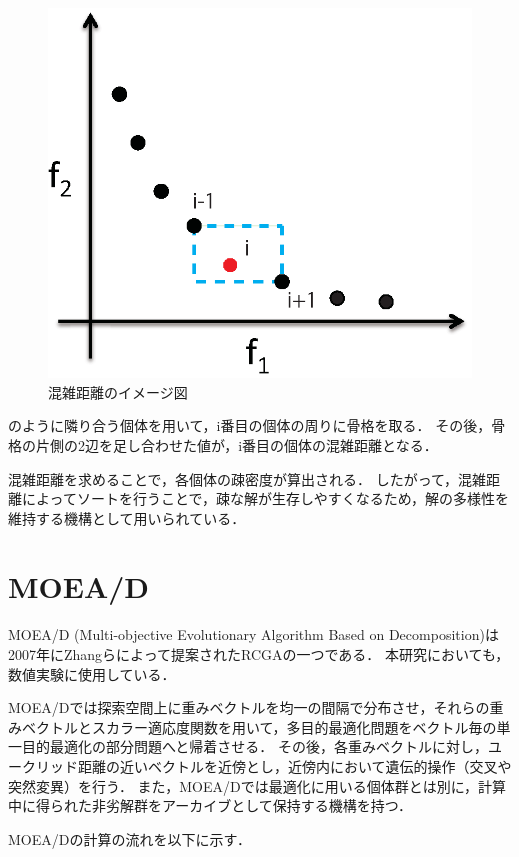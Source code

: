 \documentclass[../main/main]{subfiles}
\begin{document}
\begin{description}
\begin{figure}[htbp]
\begin{center}
\includegraphics[width=0.3\linewidth]{../figures/crowding.eps}
\end{center}
\setlength{\abovecaptionskip}{-5mm}
\setlength{\belowcaptionskip}{0mm}
\caption{混雑距離のイメージ図}
\label{cd}
\end{figure}

のように隣り合う個体を用いて，i番目の個体の周りに骨格を取る．
その後，骨格の片側の2辺を足し合わせた値が，i番目の個体の混雑距離となる．

混雑距離を求めることで，各個体の疎密度が算出される．
したがって，混雑距離によってソートを行うことで，疎な解が生存しやすくなるため，解の多様性を維持する機構として用いられている．

\end{description}

\section{MOEA/D}
\quad MOEA/D (Multi-objective Evolutionary Algorithm Based on Decomposition)\cite{Zhang2007MOEAD}は2007年にZhangらによって提案されたRCGAの一つである．
本研究においても，数値実験に使用している．

MOEA/Dでは探索空間上に重みベクトルを均一の間隔で分布させ，それらの重みベクトルとスカラー適応度関数を用いて，多目的最適化問題をベクトル毎の単一目的最適化の部分問題へと帰着させる．
その後，各重みベクトルに対し，ユークリッド距離の近いベクトルを近傍とし，近傍内において遺伝的操作（交叉や突然変異）を行う．
また，MOEA/Dでは最適化に用いる個体群とは別に，計算中に得られた非劣解群をアーカイブとして保持する機構を持つ．

MOEA/Dの計算の流れを以下に示す．
\end{document}
